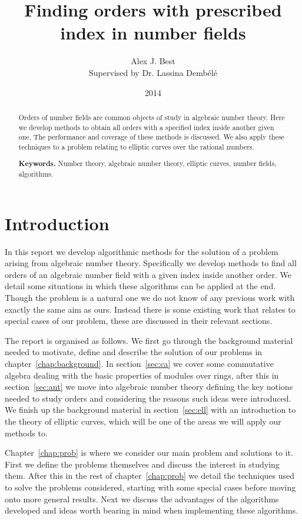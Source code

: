 \documentclass[12pt,a4paper,abstracton,bibtotoc]{scrreprt}
\author{Alex J. Best \\ {\large Supervised by Dr. Lassina Demb\'el\'e}}
\date{2014}
\title{Finding orders with prescribed index in number fields}
\theoremstyle{definition}
\begin{document}
\maketitle
\newpage\null\thispagestyle{empty}\newpage

\begin{abstract}
Orders of number fields are common objects of study in algebraic number theory.
Here we develop methods to obtain all orders with a specified index inside another given one.
The performance and coverage of these methods is discussed.
We also apply these techniques to a problem relating to elliptic curves over the rational numbers.

\smallskip
\noindent \textbf{Keywords.} Number theory, algebraic number theory, elliptic curves, number fields, algorithms.
\end{abstract}

\newpage\null\thispagestyle{empty}\newpage

\tableofcontents

\chapter{Introduction}
In this report we develop algorithmic methods for the solution of a problem arising from algebraic number theory.
Specifically we develop methods to find all orders of an algebraic number field with a given index inside another order.
We detail some situations in which these algorithms can be applied at the end.
Though the problem is a natural one we do not know of any previous work with exactly the same aim as ours.
Instead there is some existing work that relates to special cases of our problem, these are discussed in their relevant sections.

The report is organised as follows.
We first go through the background material needed to motivate, define and describe the solution of our problems in chapter~\ref{chap:background}.
In section~\ref{sec:ca} we cover some commutative algebra dealing with the basic properties of modules over rings, after this in section~\ref{sec:ant} we move into algebraic number theory defining the key notions needed to study orders and considering the reasons such ideas were introduced.
We finish up the background material in section~\ref{sec:ell} with an introduction to the theory of elliptic curves, which will be one of the areas we will apply our methods to.

Chapter~\ref{chap:prob} is where we consider our main problem and solutions to it.
First we define the problems themselves and discuss the interest in studying them.
After this in the rest of chapter~\ref{chap:prob} we detail the techniques used to solve the problems considered, starting with some special cases before moving onto more general results.
Next we discuss the advantages of the algorithms developed and ideas worth bearing in mind when implementing these algorithms.
\end{document}
